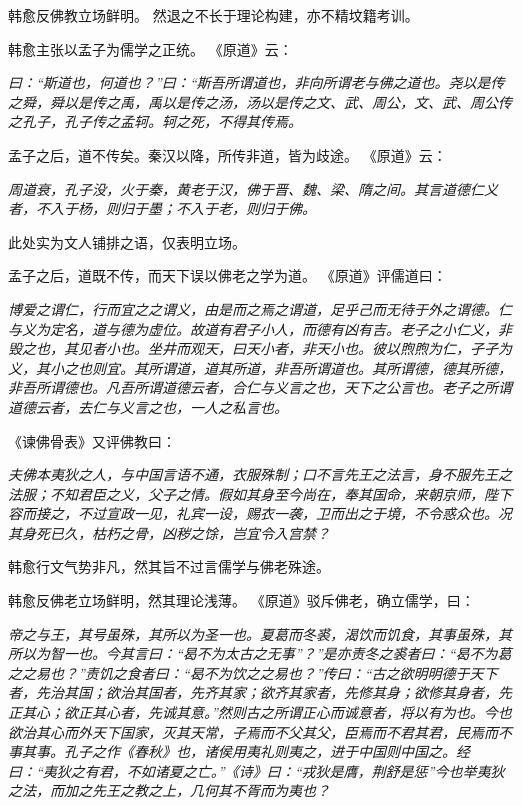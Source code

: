 \documentclass[11pt]{article}
\begin{document}
韩愈反佛教立场鲜明。
然退之不长于理论构建，亦不精坟籍考训。

\par

韩愈主张以孟子为儒学之正统。
《原道》云：

\textit{曰：“斯道也，何道也？”曰：“斯吾所谓道也，非向所谓老与佛之道也。尧以是传之舜，舜以是传之禹，禹以是传之汤，汤以是传之文、武、周公，文、武、周公传之孔子，孔子传之孟轲。轲之死，不得其传焉。}

孟子之后，道不传矣。秦汉以降，所传非道，皆为歧途。
《原道》云：

\textit{周道衰，孔子没，火于秦，黄老于汉，佛于晋、魏、梁、隋之间。其言道德仁义者，不入于杨，则归于墨；不入于老，则归于佛。}

此处实为文人铺排之语，仅表明立场。

\par

孟子之后，道既不传，而天下误以佛老之学为道。
《原道》评儒道曰：

\textit{博爱之谓仁，行而宜之之谓义，由是而之焉之谓道，足乎己而无待于外之谓德。仁与义为定名，道与德为虚位。故道有君子小人，而德有凶有吉。老子之小仁义，非毁之也，其见者小也。坐井而观天，曰天小者，非天小也。彼以煦煦为仁，孑孑为义，其小之也则宜。其所谓道，道其所道，非吾所谓道也。其所谓德，德其所德，非吾所谓德也。凡吾所谓道德云者，合仁与义言之也，天下之公言也。老子之所谓道德云者，去仁与义言之也，一人之私言也。}

《谏佛骨表》又评佛教曰：

\textit{夫佛本夷狄之人，与中国言语不通，衣服殊制；口不言先王之法言，身不服先王之法服；不知君臣之义，父子之情。假如其身至今尚在，奉其国命，来朝京师，陛下容而接之，不过宣政一见，礼宾一设，赐衣一袭，卫而出之于境，不令惑众也。况其身死已久，枯朽之骨，凶秽之馀，岂宜令入宫禁？}

韩愈行文气势非凡，然其旨不过言儒学与佛老殊途。

\par

韩愈反佛老立场鲜明，然其理论浅薄。
《原道》驳斥佛老，确立儒学，曰：

\textit{帝之与王，其号虽殊，其所以为圣一也。夏葛而冬裘，渴饮而饥食，其事虽殊，其所以为智一也。今其言曰：“曷不为太古之无事”？”是亦责冬之裘者曰：“曷不为葛之之易也？”责饥之食者曰：“曷不为饮之之易也？”传曰：“古之欲明明德于天下者，先治其国；欲治其国者，先齐其家；欲齐其家者，先修其身；欲修其身者，先正其心；欲正其心者，先诚其意。”然则古之所谓正心而诚意者，将以有为也。今也欲治其心而外天下国家，灭其天常，子焉而不父其父，臣焉而不君其君，民焉而不事其事。孔子之作《春秋》也，诸侯用夷礼则夷之，进于中国则中国之。经曰：“夷狄之有君，不如诸夏之亡。”《诗》曰：“戎狄是膺，荆舒是惩”今也举夷狄之法，而加之先王之教之上，几何其不胥而为夷也？}
\end{document}
